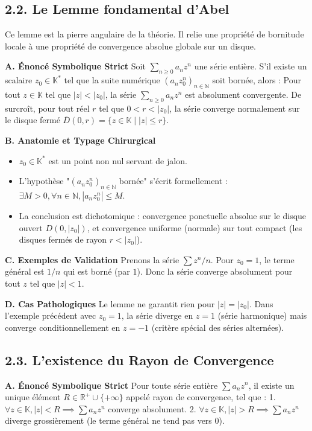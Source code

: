 \documentclass{report}
\begin{document}
\subsection*{2.2. Le Lemme fondamental d'Abel}

Ce lemme est la pierre angulaire de la théorie. Il relie une propriété de bornitude locale à une propriété de convergence absolue globale sur un disque.

\textbf{A. Énoncé Symbolique Strict}
Soit $\sum_{n \geq 0} a_n z^n$ une série entière. S'il existe un scalaire $z_0 \in \mathbb{K}^*$ tel que la suite numérique $(a_n z_0^n)_{n \in \mathbb{N}}$ soit bornée, alors :
Pour tout $z \in \mathbb{K}$ tel que $|z| < |z_0|$, la série $\sum_{n \geq 0} a_n z^n$ est absolument convergente.
De surcroît, pour tout réel $r$ tel que $0 < r < |z_0|$, la série converge normalement sur le disque fermé $\overline{D}(0, r) = \{z \in \mathbb{K} \mid |z| \leq r\}$.

\textbf{B. Anatomie et Typage Chirurgical}
\begin{itemize}
\item $z_0 \in \mathbb{K}^*$ est un point non nul servant de jalon.
\item L'hypothèse "$(a_n z_0^n)_{n \in \mathbb{N}}$ bornée" s'écrit formellement : $\exists M > 0, \forall n \in \mathbb{N}, |a_n z_0^n| \leq M$.
\item La conclusion est dichotomique : convergence ponctuelle absolue sur le disque ouvert $D(0, |z_0|)$, et convergence uniforme (normale) sur tout compact (les disques fermés de rayon $r < |z_0|$).
\end{itemize}

\textbf{C. Exemples de Validation}
Prenons la série $\sum z^n / n$. Pour $z_0 = 1$, le terme général est $1/n$ qui est borné (par $1$). Donc la série converge absolument pour tout $z$ tel que $|z| < 1$.

\textbf{D. Cas Pathologiques}
Le lemme ne garantit rien pour $|z| = |z_0|$. Dans l'exemple précédent avec $z_0 = 1$, la série diverge en $z=1$ (série harmonique) mais converge conditionnellement en $z=-1$ (critère spécial des séries alternées).

\subsection*{2.3. L'existence du Rayon de Convergence}

\textbf{A. Énoncé Symbolique Strict}
Pour toute série entière $\sum a_n z^n$, il existe un unique élément $R \in \mathbb{R}^+ \cup \{+\infty\}$ appelé rayon de convergence, tel que :
1. $\forall z \in \mathbb{K}, |z| < R \implies \sum a_n z^n$ converge absolument.
2. $\forall z \in \mathbb{K}, |z| > R \implies \sum a_n z^n$ diverge grossièrement (le terme général ne tend pas vers $0$).
\end{document}
